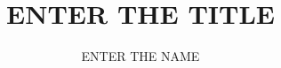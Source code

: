 \documentclass[A4]{homework}
\title{ENTER THE TITLE}
\author{ENTER THE NAME}
\begin{document}
\maketitle


%


\nocite{*} 
\printbibliography
\end{document}
